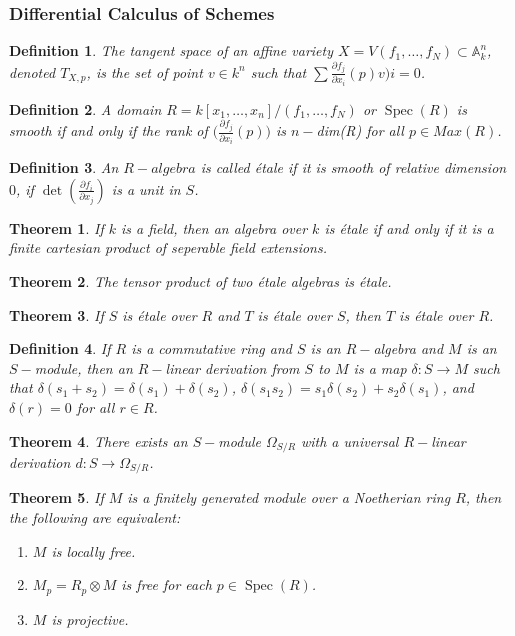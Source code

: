 \documentclass{article}
\theoremstyle{mystyle}
\newtheorem{theorem}{Theorem}[section]
\newtheorem{definition}{Definition}[section]
\DeclareMathOperator{\Spec}{Spec}
\begin{document}
\subsubsection{Differential Calculus of Schemes}
\begin{definition}
The tangent space of an affine variety $X = V(f_1,\hdots, f_N)\subset \mathbb{A}_{k}^n$, denoted $T_{X,p}$, is the set of point $v\in k^n$ such that $\sum \frac{\partial f_j}{\partial x_i}(p)v)i = 0$.
\end{definition}
\begin{definition}
A domain $R = k[x_1,\hdots ,x_n]/(f_1,\hdots, f_N)$ or $\Spec(R)$ is smooth if and only if the rank of $\big(\frac{\partial f_j}{\partial x_i}(p)\big)$ is $n-$dim(R) for all $p\in Max(R)$. 
\end{definition}
\begin{definition}
An $R-algebra$ is called \'{e}tale if it is smooth of relative dimension $0$, if $\det(\frac{\partial f_i}{\partial x_j})$ is a unit in $S$.
\end{definition}
\begin{theorem}
If $k$ is a field, then an algebra over $k$ is \'{e}tale if and only if it is a finite cartesian product of seperable field extensions. 
\end{theorem}
\begin{theorem}
The tensor product of two \'{e}tale algebras is \'{e}tale.
\end{theorem}
\begin{theorem}
If $S$ is \'{e}tale over $R$ and $T$ is \'{e}tale over $S$, then $T$ is \'{e}tale over $R$.
\end{theorem}
\begin{definition}
If $R$ is a commutative ring and $S$ is an $R-$algebra and $M$ is an $S-$module, then an $R-$linear derivation from $S$ to $M$ is a map $\delta:S\rightarrow M$ such that $\delta(s_1+s_2) = \delta(s_1)+\delta(s_2)$, $\delta(s_1 s_2) = s_1 \delta(s_2)+s_2\delta(s_1)$, and $\delta(r) = 0$ for all $r\in R$.
\end{definition}
\begin{theorem}
There exists an $S-$module $\Omega_{S/R}$ with a universal $R-$linear derivation $d:S\rightarrow \Omega_{S/R}$.
\end{theorem}
\begin{theorem}
If $M$ is a finitely generated module over a Noetherian ring $R$, then the following are equivalent:
\begin{enumerate}
    \item $M$ is locally free.
    \item $M_p = R_p \otimes M$ is free for each $p \in \Spec(R)$.
    \item $M$ is projective.
\end{enumerate}
\end{theorem}
\end{document}
